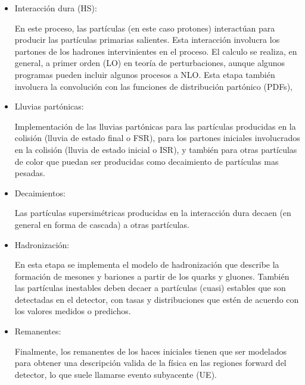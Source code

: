 \begin{itemize}

\item Interacción dura (HS):

  En este proceso, las partículas (en este caso protones) interactúan para
  producir las partículas primarias salientes. Esta interacción
  involucra los partones de los hadrones intervinientes en el proceso. El
  calculo se realiza, en general, a primer orden (LO) en teoría de
  perturbaciones, aunque algunos programas pueden incluir algunos procesos a
  NLO. Esta etapa también involucra la convolución con las funciones de
  distribución partónico (PDFs),

\item Lluvias partónicas:

  Implementación de las lluvias partónicas para las partículas producidas en la
  colisión (lluvia de estado final o FSR), para los partones iniciales
  involucrados en la colisión (lluvia de estado inicial o ISR), y también para
  otras partículas de color que puedan ser producidas como decaimiento de
  partículas mas pesadas.


\item Decaimientos:

  Las partículas supersimétricas producidas en la interacción dura decaen (en
  general en forma de cascada) a otras partículas.


\item Hadronización:

  En esta etapa se implementa el modelo de hadronización que describe la
  formación de mesones y bariones a partir de los quarks y gluones. También las
  partículas inestables deben decaer a partículas (cuasi) estables que son
  detectadas en el detector, con tasas y distribuciones que estén de acuerdo con
  los valores medidos o predichos.

\item Remanentes:

  Finalmente, los remanentes de los haces iniciales tienen que ser
  modelados para obtener una descripción valida de la física en las regiones
  forward del detector, lo que suele llamarse evento subyacente (UE).

\end{itemize}

